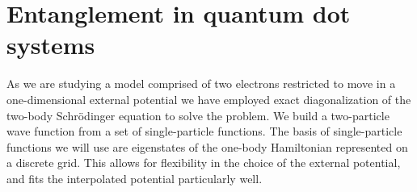 \documentclass[twocolumn,superscriptaddress,unsortedaddress,
 amsmath,amssymb,
 aps,
]{revtex4-2}
\begin{document}
% 
% 

\section{Entanglement in quantum dot systems}
    As we are studying a model comprised of two electrons restricted to move in a
    one-dimensional external potential we have employed exact diagonalization of the
    two-body Schrödinger equation to solve the problem.
    We build a two-particle wave function from a set of single-particle
    functions.
    The basis of single-particle functions we will use are eigenstates of the
    one-body Hamiltonian represented on a discrete grid.
    This allows for flexibility in the choice of the external potential, and fits the
    interpolated potential particularly well.
\end{document}
